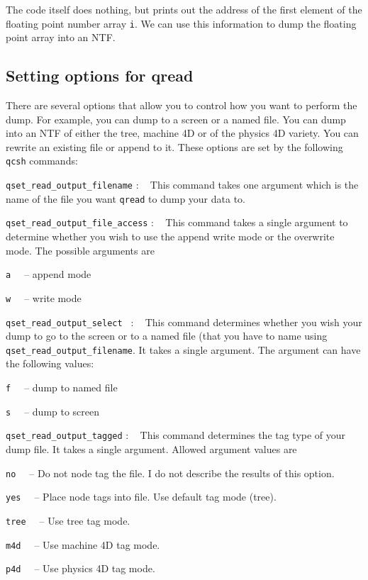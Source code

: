 The code itself does nothing, but prints out the address of the first 
element of the floating point number array {\tt i}. We can use this 
information to dump the floating point array into an NTF.

\subsection{Setting options for qread}
There are several options that allow you to control how you want to
perform the dump. For example, you can dump to a screen or a named 
file. You can dump into an NTF of either the tree, machine 4D or 
of the physics 4D variety. You can rewrite an existing file or 
append to it. These options are set by the following {\tt qcsh} commands:
\begin{description}
\item{{\tt qset\_read\_output\_filename} : \ } This command takes one 
argument which is the name of the file you want {\tt qread} to 
dump your data to.
\item{{\tt qset\_read\_output\_file\_access} : \ } This command 
takes a single argument to determine whether you wish to use
the append write mode or the overwrite mode. The possible arguments
are 
	\begin{description}
	\item{\tt a \ } -- append mode
	\item{\tt w \ } -- write mode
	\end{description}
\item{{\tt qset\_read\_output\_select } : \ } This command determines 
whether you wish your dump to go to the screen or to a named file
(that you have to name using {\tt qset\_read\_output\_filename}.
It takes a single argument. The argument can have the following values:
\begin{description}
	\item{\tt f \ } -- dump to named file
	\item{\tt s \ } -- dump to screen
\end{description}
\item{{\tt qset\_read\_output\_tagged} : \ } This command determines
the tag type of your dump file. It takes a single argument. Allowed 
argument values are
\begin{description}
\item{ \tt no \ } -- Do not node tag the file. I do not describe the
results of this option. 
\item{ \tt yes \ } -- Place node tags into file. Use default tag mode (tree).
\item{ \tt tree \ } -- Use tree tag mode.
\item{ \tt m4d \ } -- Use machine 4D tag mode.
\item{ \tt p4d \ } -- Use physics 4D tag mode.
\end{description}
\end{description}

